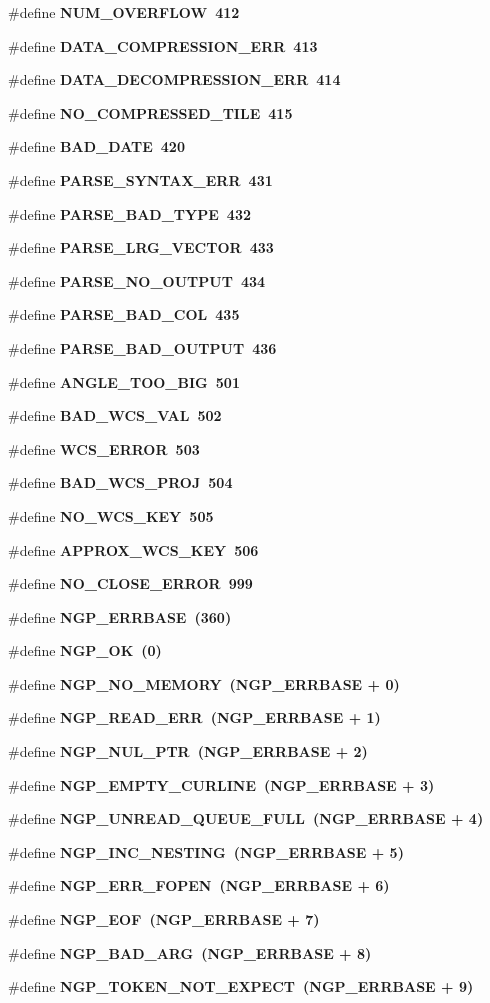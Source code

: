 \begin{CompactItemize}
\#define \bf{NUM\_\-OVERFLOW}~412
\item 
\#define \bf{DATA\_\-COMPRESSION\_\-ERR}~413
\item 
\#define \bf{DATA\_\-DECOMPRESSION\_\-ERR}~414
\item 
\#define \bf{NO\_\-COMPRESSED\_\-TILE}~415
\item 
\#define \bf{BAD\_\-DATE}~420
\item 
\#define \bf{PARSE\_\-SYNTAX\_\-ERR}~431
\item 
\#define \bf{PARSE\_\-BAD\_\-TYPE}~432
\item 
\#define \bf{PARSE\_\-LRG\_\-VECTOR}~433
\item 
\#define \bf{PARSE\_\-NO\_\-OUTPUT}~434
\item 
\#define \bf{PARSE\_\-BAD\_\-COL}~435
\item 
\#define \bf{PARSE\_\-BAD\_\-OUTPUT}~436
\item 
\#define \bf{ANGLE\_\-TOO\_\-BIG}~501
\item 
\#define \bf{BAD\_\-WCS\_\-VAL}~502
\item 
\#define \bf{WCS\_\-ERROR}~503
\item 
\#define \bf{BAD\_\-WCS\_\-PROJ}~504
\item 
\#define \bf{NO\_\-WCS\_\-KEY}~505
\item 
\#define \bf{APPROX\_\-WCS\_\-KEY}~506
\item 
\#define \bf{NO\_\-CLOSE\_\-ERROR}~999
\item 
\#define \bf{NGP\_\-ERRBASE}~(360)
\item 
\#define \bf{NGP\_\-OK}~(0)
\item 
\#define \bf{NGP\_\-NO\_\-MEMORY}~(NGP\_\-ERRBASE + 0)
\item 
\#define \bf{NGP\_\-READ\_\-ERR}~(NGP\_\-ERRBASE + 1)
\item 
\#define \bf{NGP\_\-NUL\_\-PTR}~(NGP\_\-ERRBASE + 2)
\item 
\#define \bf{NGP\_\-EMPTY\_\-CURLINE}~(NGP\_\-ERRBASE + 3)
\item 
\#define \bf{NGP\_\-UNREAD\_\-QUEUE\_\-FULL}~(NGP\_\-ERRBASE + 4)
\item 
\#define \bf{NGP\_\-INC\_\-NESTING}~(NGP\_\-ERRBASE + 5)
\item 
\#define \bf{NGP\_\-ERR\_\-FOPEN}~(NGP\_\-ERRBASE + 6)
\item 
\#define \bf{NGP\_\-EOF}~(NGP\_\-ERRBASE + 7)
\item 
\#define \bf{NGP\_\-BAD\_\-ARG}~(NGP\_\-ERRBASE + 8)
\item 
\#define \bf{NGP\_\-TOKEN\_\-NOT\_\-EXPECT}~(NGP\_\-ERRBASE + 9)
\end{CompactItemize}
